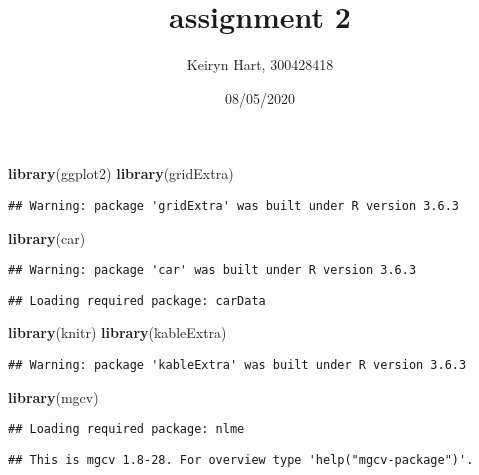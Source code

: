 \documentclass[]{article}
\title{assignment 2}
\author{Keiryn Hart, 300428418}
\date{08/05/2020}
\newenvironment{Shaded}{\begin{snugshade}}{\end{snugshade}}
\newcommand{\KeywordTok}[1]{\textcolor[rgb]{0.13,0.29,0.53}{\textbf{#1}}}
\newcommand{\NormalTok}[1]{#1}
\begin{document}
\maketitle

\begin{Shaded}
\begin{Highlighting}[]
\KeywordTok{library}\NormalTok{(ggplot2)}
\KeywordTok{library}\NormalTok{(gridExtra)}
\end{Highlighting}
\end{Shaded}

\begin{verbatim}
## Warning: package 'gridExtra' was built under R version 3.6.3
\end{verbatim}

\begin{Shaded}
\begin{Highlighting}[]
\KeywordTok{library}\NormalTok{(car)}
\end{Highlighting}
\end{Shaded}

\begin{verbatim}
## Warning: package 'car' was built under R version 3.6.3
\end{verbatim}

\begin{verbatim}
## Loading required package: carData
\end{verbatim}

\begin{Shaded}
\begin{Highlighting}[]
\KeywordTok{library}\NormalTok{(knitr)}
\KeywordTok{library}\NormalTok{(kableExtra)}
\end{Highlighting}
\end{Shaded}

\begin{verbatim}
## Warning: package 'kableExtra' was built under R version 3.6.3
\end{verbatim}

\begin{Shaded}
\begin{Highlighting}[]
\KeywordTok{library}\NormalTok{(mgcv)}
\end{Highlighting}
\end{Shaded}

\begin{verbatim}
## Loading required package: nlme
\end{verbatim}

\begin{verbatim}
## This is mgcv 1.8-28. For overview type 'help("mgcv-package")'.
\end{verbatim}
\end{document}
